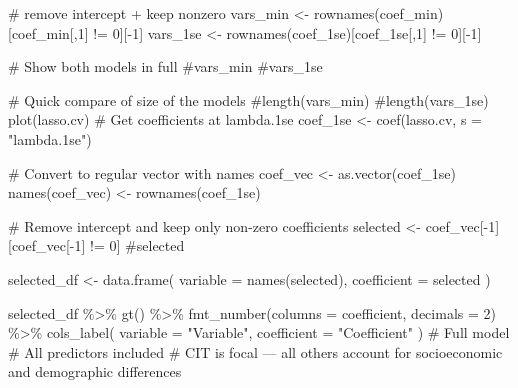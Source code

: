 \documentclass[
  letterpaper,
  DIV=11,
  numbers=noendperiod]{scrartcl}
\newenvironment{Shaded}{\begin{snugshade}}{\end{snugshade}}
\newcommand{\AttributeTok}[1]{\textcolor[rgb]{0.40,0.45,0.13}{#1}}
\newcommand{\CommentTok}[1]{\textcolor[rgb]{0.37,0.37,0.37}{#1}}
\newcommand{\DecValTok}[1]{\textcolor[rgb]{0.68,0.00,0.00}{#1}}
\newcommand{\FunctionTok}[1]{\textcolor[rgb]{0.28,0.35,0.67}{#1}}
\newcommand{\NormalTok}[1]{\textcolor[rgb]{0.00,0.23,0.31}{#1}}
\newcommand{\OtherTok}[1]{\textcolor[rgb]{0.00,0.23,0.31}{#1}}
\newcommand{\SpecialCharTok}[1]{\textcolor[rgb]{0.37,0.37,0.37}{#1}}
\newcommand{\StringTok}[1]{\textcolor[rgb]{0.13,0.47,0.30}{#1}}
\begin{document}
\begin{Shaded}
\begin{Highlighting}[]
\CommentTok{\# remove intercept + keep nonzero}
\NormalTok{vars\_min }\OtherTok{\textless{}{-}} \FunctionTok{rownames}\NormalTok{(coef\_min)[coef\_min[,}\DecValTok{1}\NormalTok{] }\SpecialCharTok{!=} \DecValTok{0}\NormalTok{][}\SpecialCharTok{{-}}\DecValTok{1}\NormalTok{]}
\NormalTok{vars\_1se }\OtherTok{\textless{}{-}} \FunctionTok{rownames}\NormalTok{(coef\_1se)[coef\_1se[,}\DecValTok{1}\NormalTok{] }\SpecialCharTok{!=} \DecValTok{0}\NormalTok{][}\SpecialCharTok{{-}}\DecValTok{1}\NormalTok{]}

\CommentTok{\# Show both models in full}
\CommentTok{\#vars\_min}
\CommentTok{\#vars\_1se}

\CommentTok{\# Quick compare of size of the models}
\CommentTok{\#length(vars\_min)}
\CommentTok{\#length(vars\_1se)}
\FunctionTok{plot}\NormalTok{(lasso.cv)}
\CommentTok{\# Get coefficients at lambda.1se}
\NormalTok{coef\_1se }\OtherTok{\textless{}{-}} \FunctionTok{coef}\NormalTok{(lasso.cv, }\AttributeTok{s =} \StringTok{"lambda.1se"}\NormalTok{)}

\CommentTok{\# Convert to regular vector with names}
\NormalTok{coef\_vec }\OtherTok{\textless{}{-}} \FunctionTok{as.vector}\NormalTok{(coef\_1se)}
\FunctionTok{names}\NormalTok{(coef\_vec) }\OtherTok{\textless{}{-}} \FunctionTok{rownames}\NormalTok{(coef\_1se)}

\CommentTok{\# Remove intercept and keep only non{-}zero coefficients}
\NormalTok{selected }\OtherTok{\textless{}{-}}\NormalTok{ coef\_vec[}\SpecialCharTok{{-}}\DecValTok{1}\NormalTok{][coef\_vec[}\SpecialCharTok{{-}}\DecValTok{1}\NormalTok{] }\SpecialCharTok{!=} \DecValTok{0}\NormalTok{]}
\CommentTok{\#selected}


\NormalTok{selected\_df }\OtherTok{\textless{}{-}} \FunctionTok{data.frame}\NormalTok{(}
  \AttributeTok{variable =} \FunctionTok{names}\NormalTok{(selected),}
  \AttributeTok{coefficient =}\NormalTok{ selected}
\NormalTok{)}

\NormalTok{selected\_df }\SpecialCharTok{\%\textgreater{}\%}
  \FunctionTok{gt}\NormalTok{() }\SpecialCharTok{\%\textgreater{}\%}
  \FunctionTok{fmt\_number}\NormalTok{(}\AttributeTok{columns =}\NormalTok{ coefficient, }\AttributeTok{decimals =} \DecValTok{2}\NormalTok{) }\SpecialCharTok{\%\textgreater{}\%}
  \FunctionTok{cols\_label}\NormalTok{(}
    \AttributeTok{variable =} \StringTok{"Variable"}\NormalTok{,}
    \AttributeTok{coefficient =} \StringTok{"Coefficient"}
\NormalTok{  )}
\CommentTok{\# Full model}
\CommentTok{\# All predictors included}
\CommentTok{\# CIT is focal — all others account for socioeconomic and demographic differences}


\end{Highlighting}
\end{Shaded}
\end{document}
